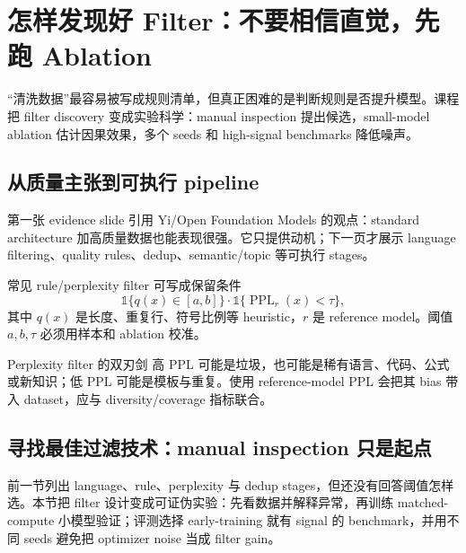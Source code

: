 \section{怎样发现好 Filter：不要相信直觉，先跑 Ablation}

“清洗数据”最容易被写成规则清单，但真正困难的是判断规则是否提升模型。课程把 filter discovery 变成实验科学：manual inspection 提出候选，small-model ablation 估计因果效果，多个 seeds 和 high-signal benchmarks 降低噪声。

\subsection{从质量主张到可执行 pipeline}

第一张 evidence slide 引用 Yi/Open Foundation Models 的观点：standard architecture 加高质量数据也能表现很强。它只提供动机；下一页才展示 language filtering、quality rules、dedup、semantic/topic 等可执行 stages。



常见 rule/perplexity filter 可写成保留条件
\[
\mathbb{1}\{q(x)\in[a,b]\}\cdot \mathbb{1}\{\operatorname{PPL}_{r}(x)<\tau\},
\]
其中 $q(x)$ 是长度、重复行、符号比例等 heuristic，$r$ 是 reference model。阈值 $a,b,\tau$ 必须用样本和 ablation 校准。

\begin{warningbox}{Perplexity filter 的双刃剑}
高 PPL 可能是垃圾，也可能是稀有语言、代码、公式或新知识；低 PPL 可能是模板与重复。使用 reference-model PPL 会把其 bias 带入 dataset，应与 diversity/coverage 指标联合。
\end{warningbox}

\subsection{寻找最佳过滤技术：manual inspection 只是起点}

前一节列出 language、rule、perplexity 与 dedup stages，但还没有回答阈值怎样选。本节把 filter 设计变成可证伪实验：先看数据并解释异常，再训练 matched-compute 小模型验证；评测选择 early-training 就有 signal 的 benchmark，并用不同 seeds 避免把 optimizer noise 当成 filter gain。


